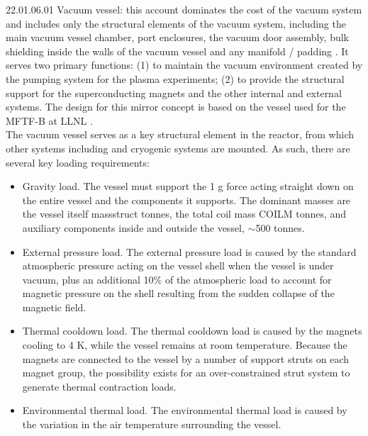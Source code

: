 22.01.06.01 Vacuum vessel: this account dominates the cost of the vacuum system and includes only the structural elements of the vacuum system, including the main vacuum vessel chamber, port enclosures, the vacuum door assembly, bulk shielding inside the walls of the vacuum vessel and any manifold / padding \cite{waganer2006design}. It serves two primary functions: (1) to maintain the vacuum environment created by the pumping system for the plasma experiments; (2) to provide the structural support for the superconducting magnets and the other internal and external systems. The design for this mirror concept is based on the vessel used for the MFTF-B at LLNL \cite{gerich1986design}. \\

The vacuum vessel serves as a  key structural element in the reactor, from which other systems including and cryogenic systems are mounted.  As such, there are several key loading requirements:

\begin{itemize}
    \item Gravity load. The vessel must support the 1 g force acting straight down on the entire vessel and the components it supports. The dominant masses are the vessel itself massstruct tonnes, the total coil mass COILM tonnes, and auxiliary components inside and outside the vessel, $\sim$500 tonnes.

    \item External pressure load. The external pressure load is caused by the standard atmospheric pressure acting on the vessel shell when the vessel is under vacuum, plus an additional 10\% of the atmospheric load to account for magnetic  pressure on the shell resulting from the sudden collapse of the magnetic field. 

    \item Thermal cooldown load. The thermal cooldown load is  caused by the magnets cooling to 4 K, while the vessel remains at room temperature. Because the magnets are connected to the vessel by a number of support struts on each  magnet group, the possibility exists for an over-constrained  strut system to generate thermal contraction loads.

    \item Environmental thermal load. The environmental thermal load is caused by the variation in the air temperature surrounding the vessel.

\end{itemize}

